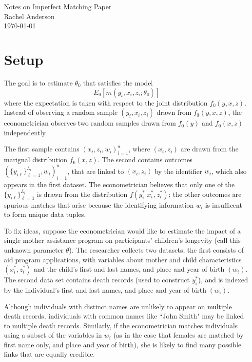 \documentclass[12pt]{article}
\date{\vspace{-30pt}\today}
\begin{document}
\begin{center}
\Large{\singlespacing Notes on Imperfect Matching Paper \\ 
Rachel Anderson \\
\today \\}
\end{center} 
\section{Setup}
The goal is to estimate $\theta_0$ that satisfies the model
\begin{equation} E_0[m(y_i, x_i, z_i; \theta_0)]  \label{model} \end{equation}
where the expectation is taken with respect to the joint distribution $f_0(y, x,z)$.  Instead of observing a random sample $(y_i,x_i,z_i)$ drawn from $f_0(y,x,z)$, the econometrician observes two random samples drawn from $f_0(y)$ and $f_0(x,z)$ independently.  

The first sample contains $(x_i, z_i, w_i)_{i=1}^n$, where $(x_i, z_i)$ are drawn from the marignal distribution $f_0(x,z)$.   The second contains outcomes $(\{y_{i\ell}\}_{\ell = 1}^{L_i}, w_i)_{i=1}^n$, that are linked to $(x_i, z_i)$ by the identifier $w_i$, which also appears in the first dataset.  The econometrician believes that only one of the $\{y_{i\ell}\}_{\ell=1}^{L_i}$ is drawn from the distribution $f(y_i^* | x_i^*, z_i^*)$; the other outcomes are spurious matches that arise because the identifying information $w_i$ is insufficent to form unique data tuples. 

To fix ideas, suppose the econometrician would like to estimate the impact of a single mother assistance program on participants' children's longevity (call this unknown parameter $\theta$).  The researcher collects two datasets; the first consists of aid program applications, with variables about mother and child characteristics $(x_i^*, z_i^*)$ and the child's first and last names, and place and year of birth $(w_i)$.  The second data set contains death records (used to construct $y_i^*$), and is indexed by the individual's first and last names, and place and year of birth $(w_i)$.    

Although individuals with distinct names are unlikely to appear on multiple death records, individuals with common names like ``John Smith" may be linked to multiple death records.  Similarly, if the econometrician matches individuals using a subset of the variables in $w_i$ (as in the case that females are matched by first name only, and place and year of birth), she is likely to find many possible links that are equally credible.  
\end{document}
